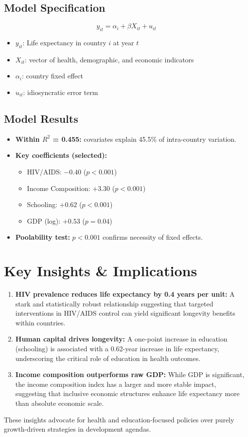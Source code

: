 \documentclass[11pt]{article}
\begin{document}
\subsection*{Model Specification}
\[
y_{it} = \alpha_i + \beta X_{it} + u_{it}
\]
\vspace{-1em}
\begin{itemize}
    \item $y_{it}$: Life expectancy in country $i$ at year $t$
    \item $X_{it}$: vector of health, demographic, and economic indicators
    \item $\alpha_i$: country fixed effect
    \item $u_{it}$: idiosyncratic error term
\end{itemize}

\subsection*{Model Results}
\begin{itemize}
    \item \textbf{Within $R^2$ = 0.455:} covariates explain 45.5\% of intra-country variation.
    \item \textbf{Key coefficients (selected):}
    \begin{itemize}
        \item HIV/AIDS: $-0.40$ ($p<0.001$)
        \item Income Composition: $+3.30$ ($p<0.001$)
        \item Schooling: $+0.62$ ($p<0.001$)
        \item GDP (log): $+0.53$ ($p=0.04$)
    \end{itemize}
    \item \textbf{Poolability test:} $p<0.001$ confirms necessity of fixed effects.
\end{itemize}

\section*{Key Insights \& Implications}

\begin{enumerate}[label=\textbf{Insight \arabic*:}, leftmargin=1.2cm]
    \item \textbf{HIV prevalence reduces life expectancy by 0.4 years per unit:} A stark and statistically robust relationship suggesting that targeted interventions in HIV/AIDS control can yield significant longevity benefits within countries.
    
    \item \textbf{Human capital drives longevity:} A one-point increase in education (schooling) is associated with a 0.62-year increase in life expectancy, underscoring the critical role of education in health outcomes.
    
    \item \textbf{Income composition outperforms raw GDP:} While GDP is significant, the income composition index has a larger and more stable impact, suggesting that inclusive economic structures enhance life expectancy more than absolute economic scale.
\end{enumerate}

\vspace{0.5em}
These insights advocate for health and education-focused policies over purely growth-driven strategies in development agendas.
\end{document}
